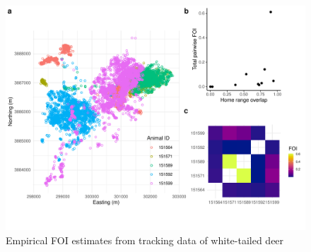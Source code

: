 \documentclass[letterpaper]{article}
\begin{document}
\begin{figure}
     \includegraphics[width=\textwidth]{figures/deer_results.pdf}
    \caption{Empirical FOI estimates from tracking data of white-tailed deer}
	\label{fig:empiricalres}
\end{figure}
\end{document}
